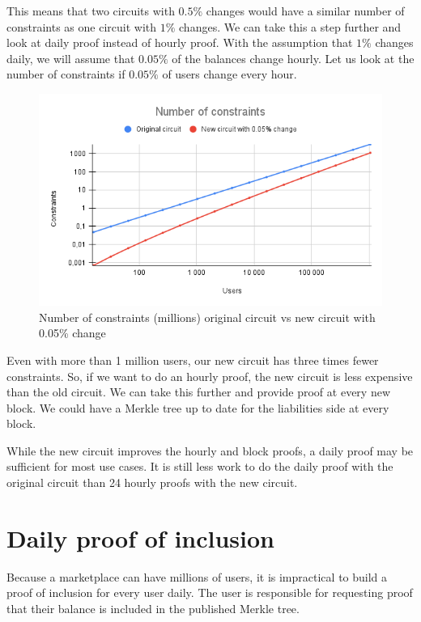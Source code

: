 This means that two circuits with $0.5\%$ changes would have a similar number of constraints as one circuit with $1\%$ changes.
We can take this a step further and look at daily proof instead of hourly proof.
With the assumption that $1\%$ changes daily, we will assume that $0.05\%$ of the balances change hourly.
Let us look at the number of constraints if $0.05\%$ of users change every hour.
\begin{figure}[H]
   \centering
   \includegraphics[width=130mm]{Number of constraints .05.png}
   \caption{Number of constraints (millions) original circuit vs new circuit with 0.05\% change}
   \label{overflow}
   \end{figure}
Even with more than 1 million users, our new circuit has three times fewer constraints.
So, if we want to do an hourly proof, the new circuit is less expensive than the old circuit.
We can take this further and provide proof at every new block. We could have a Merkle tree up to date for the liabilities side at every block.

While the new circuit improves the hourly and block proofs, a daily proof may be sufficient for most use cases.
It is still less work to do the daily proof with the original circuit than 24 hourly proofs with the new circuit. 

\section{Daily proof of inclusion}
Because a marketplace can have millions of users, it is impractical to build a proof of inclusion for every user daily.
The user is responsible for requesting proof that their balance is included in the published Merkle tree.


